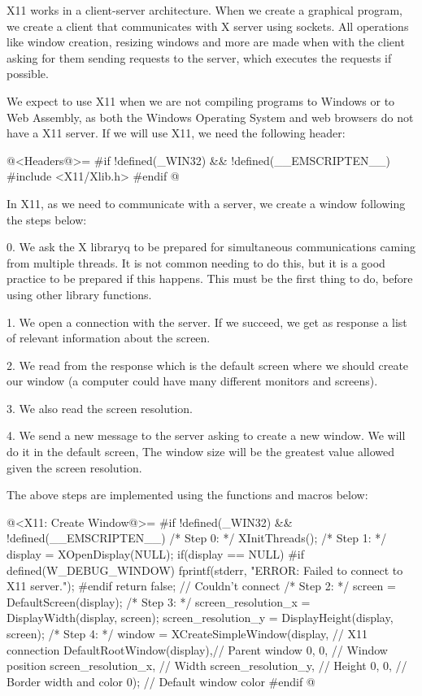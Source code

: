 X11 works in a client-server architecture. When we create a graphical
program, we create a client that communicates with X server using
sockets. All operations like window creation, resizing windows and
more are made when with the client asking for them sending requests to
the server, which executes the requests if possible.

We expect to use X11 when we are not compiling programs to Windows or
to Web Assembly, as both the Windows Operating System and web browsers
do not have a X11 server. If we will use X11, we need the following
header:

\iniciocodigo
@<Headers@>=
#if !defined(_WIN32) && !defined(__EMSCRIPTEN__)
#include <X11/Xlib.h>
#endif
@
\fimcodigo

In X11, as we need to communicate with a server, we create a window
following the steps below:

0. We ask the X libraryq to be prepared for simultaneous
communications caming from multiple threads. It is not common needing
to do this, but it is a good practice to be prepared if this
happens. This must be the first thing to do, before using other
library functions.

1. We open a connection with the server. If we succeed, we get as
response a list of relevant information about the screen.

2. We read from the response which is the default screen where we
should create our window (a computer could have many different
monitors and screens).

3. We also read the screen resolution.

4. We send a new message to the server asking to create a new
window. We will do it in the default screen, The window size will be
the greatest value allowed given the screen resolution.

The above steps are implemented using the functions and macros below:

\iniciocodigo
@<X11: Create Window@>=
#if !defined(_WIN32) && !defined(__EMSCRIPTEN__)
/* Step 0: */
XInitThreads();
/* Step 1: */
display = XOpenDisplay(NULL);
if(display == NULL){
#if defined(W_DEBUG_WINDOW)
  fprintf(stderr, "ERROR: Failed to connect to X11 server.\n");
#endif
  return false; // Couldn't connect
}
/* Step 2: */
screen = DefaultScreen(display);
/* Step 3: */
screen_resolution_x = DisplayWidth(display, screen);
screen_resolution_y = DisplayHeight(display, screen);
/* Step 4: */
window = XCreateSimpleWindow(display, // X11 connection
                             DefaultRootWindow(display),// Parent window
                             0, 0, // Window position
                             screen_resolution_x, // Width
                             screen_resolution_y, // Height
                             0, 0, // Border width and color
                             0); // Default window color
#endif
@
\fimcodigo

